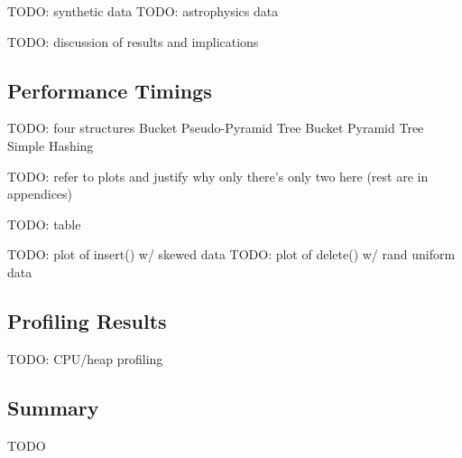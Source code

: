 TODO: synthetic data
TODO: astrophysics data

TODO: discussion of results and implications

\subsection{Performance Timings}

TODO: four structures
	Bucket Pseudo-Pyramid Tree
	Bucket Pyramid Tree
	Simple Hashing

TODO: refer to plots and justify why only there's only two here (rest are in appendices)

TODO: table

TODO: plot of insert() w/ skewed data
TODO: plot of delete() w/ rand uniform data

\subsection{Profiling Results}

TODO: CPU/heap profiling

\subsection{Summary}

TODO
